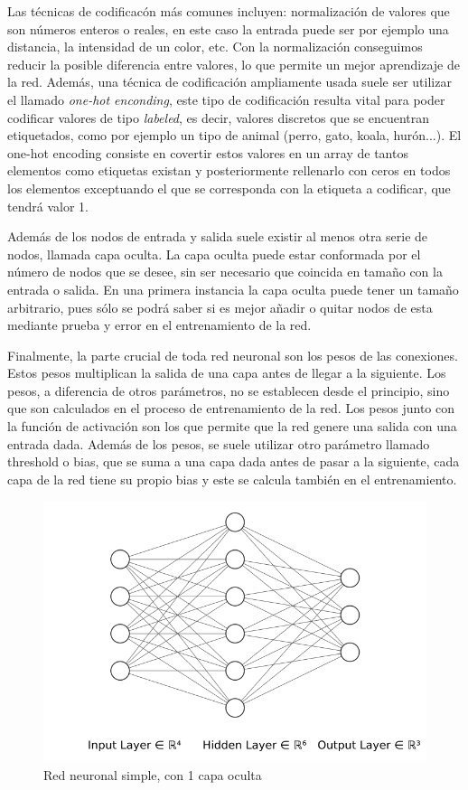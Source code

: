     Las técnicas de codificacón más comunes incluyen: normalización de valores que son números enteros o reales, en este caso la entrada puede ser por ejemplo una distancia, la intensidad de un color, etc. Con la normalización conseguimos reducir la posible diferencia entre valores, lo que permite un mejor aprendizaje de la red. Además, una técnica de codificación ampliamente usada suele ser utilizar el llamado \textit{one-hot enconding}, este tipo de codificación resulta vital para poder codificar valores de tipo \textit{labeled}, es decir, valores discretos que se encuentran etiquetados, como por ejemplo un tipo de animal (perro, gato, koala, hurón...). El one-hot encoding consiste en covertir estos valores en un array de tantos elementos como etiquetas existan y posteriormente rellenarlo con ceros en todos los elementos exceptuando el que se corresponda con la etiqueta a codificar, que tendrá valor 1.

    Además de los nodos de entrada y salida suele existir al menos otra serie de nodos, llamada capa oculta. La capa oculta puede estar conformada por el número de nodos que se desee, sin ser necesario que coincida en tamaño con la entrada o salida. En una primera instancia la capa oculta puede tener un tamaño arbitrario, pues sólo se podrá saber si es mejor añadir o quitar nodos de esta mediante prueba y error en el entrenamiento de la red.

    Finalmente, la parte crucial de toda red neuronal son los pesos de las conexiones. Estos pesos multiplican la salida de una capa antes de llegar a la siguiente. Los pesos, a diferencia de otros parámetros, no se establecen desde el principio, sino que son calculados en el proceso de entrenamiento de la red. Los pesos junto con la función de activación son los que permite que la red genere una salida con una entrada dada. Además de los pesos, se suele utilizar otro parámetro llamado threshold o bias, que se suma a una capa dada antes de pasar a la siguiente, cada capa de la red tiene su propio bias y este se calcula también en el entrenamiento.

    \begin{figure}
        \centering
        \includegraphics[width=1\textwidth]{Imagenes/Bitmap/nn.png}
        \caption{Red neuronal simple, con 1 capa oculta}
        \label{fig:simpleNN}
    \end{figure}

